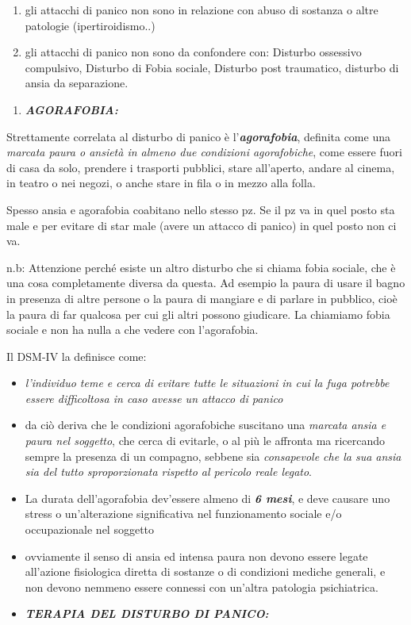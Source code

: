 \documentclass[]{article}
\begin{document}
\begin{enumerate}
\def\labelenumi{\arabic{enumi}.}
\item
  gli attacchi di panico non sono in relazione con abuso di sostanza o
  altre patologie (ipertiroidismo..)
\item
  gli attacchi di panico non sono da confondere con: Disturbo ossessivo
  compulsivo, Disturbo di Fobia sociale, Disturbo post traumatico,
  disturbo di ansia da separazione.
\end{enumerate}

\begin{enumerate}
\def\labelenumi{\arabic{enumi}.}
\item
  \textbf{\emph{AGORAFOBIA:}}
\end{enumerate}

Strettamente correlata al disturbo di panico è
l'\textbf{\emph{agorafobia}}, definita come una \emph{marcata paura o
ansietà in almeno due condizioni agorafobiche}, come essere fuori di
casa da solo, prendere i trasporti pubblici, stare all'aperto, andare al
cinema, in teatro o nei negozi, o anche stare in fila o in mezzo alla
folla.

Spesso ansia e agorafobia coabitano nello stesso pz. Se il pz va in quel
posto sta male e per evitare di star male (avere un attacco di panico)
in quel posto non ci va.

n.b: Attenzione perché esiste un altro disturbo che si chiama fobia
sociale, che è una cosa completamente diversa da questa. Ad esempio la
paura di usare il bagno in presenza di altre persone o la paura di
mangiare e di parlare in pubblico, cioè la paura di far qualcosa per cui
gli altri possono giudicare. La chiamiamo fobia sociale e non ha nulla a
che vedere con l'agorafobia.

Il DSM-IV la definisce come:

\begin{itemize}
\item
  \emph{l'individuo teme e cerca di evitare tutte le situazioni in cui
  la fuga potrebbe essere difficoltosa in caso avesse un attacco di
  panico}
\item
  da ciò deriva che le condizioni agorafobiche suscitano una
  \emph{marcata ansia e paura nel soggetto}, che cerca di evitarle, o al
  più le affronta ma ricercando sempre la presenza di un compagno,
  sebbene sia \emph{consapevole che la sua ansia sia del tutto
  sproporzionata rispetto al pericolo reale legato}.
\item
  La durata dell'agorafobia dev'essere almeno di \textbf{\emph{6 mesi}},
  e deve causare uno stress o un'alterazione significativa nel
  funzionamento sociale e/o occupazionale nel soggetto
\item
  ovviamente il senso di ansia ed intensa paura non devono essere legate
  all'azione fisiologica diretta di sostanze o di condizioni mediche
  generali, e non devono nemmeno essere connessi con un'altra patologia
  psichiatrica.
\item
  \textbf{\emph{TERAPIA DEL DISTURBO DI PANICO:}}
\end{itemize}
\end{document}
